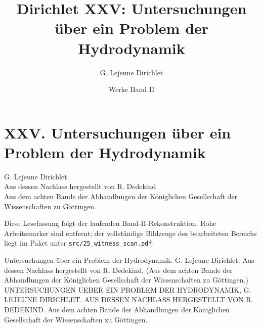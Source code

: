 \documentclass[11pt]{article}
\title{Dirichlet XXV: Untersuchungen über ein Problem der Hydrodynamik}
\author{G. Lejeune Dirichlet}
\date{Werke Band II}
\begin{document}
\maketitle

\section*{XXV. Untersuchungen über ein Problem der Hydrodynamik}
\begin{center}
G. Lejeune Dirichlet\\
Aus dessen Nachlass hergestellt von R. Dedekind\\
Aus dem achten Bande der Abhandlungen der Königlichen Gesellschaft der Wissenschaften zu Göttingen.
\end{center}
\medskip
\noindent Diese Lesefassung folgt der laufenden Band-II-Rekonstruktion. Rohe Arbeitsmarker sind entfernt; der vollständige Bildzeuge des bearbeiteten Bereichs liegt im Paket unter \texttt{src/25\_witness\_scan.pdf}.


Untersuchungen über ein Problem der Hydrodynamik.
G. Lejeune Dirichlet.
Aus dessen Nachlass hergestellt von R. Dedekind.
(Aus dem achten Bande der Abhandlungen der Königlichen Gesellschaft der Wissenschaften zu Göttingen.)
UNTERSUCHUNGEN UEBER EIN PROBLEM DER HYDRODYNAMIK, G. LEJEUNE DIRICHLET. AUS DESSEN NACHLASS HERGESTELLT VON R. DEDEKIND. Aus dem achten Bande der Abhandlungen der Königlichen Gesellschaft der Wissenschaften zu Göttingen.
\end{document}
